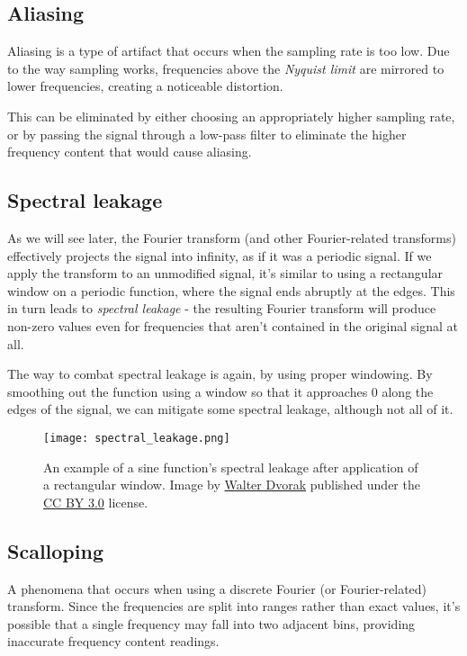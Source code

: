 \subsection{Aliasing}
Aliasing is a type of artifact that occurs when the sampling rate is too low. Due to the way sampling works, frequencies above the \emph{Nyquist limit} are mirrored to lower frequencies, creating a noticeable distortion. \cite{bosi_goldberg_2003}

This can be eliminated by either choosing an appropriately higher sampling rate, or by passing the signal through a low-pass filter to eliminate the higher frequency content that would cause aliasing.

\subsection{Spectral leakage}
As we will see later, the Fourier transform (and other Fourier-related transforms) effectively projects the signal into infinity, as if it was a periodic signal. If we apply the transform to an unmodified signal, it's similar to using a rectangular window on a periodic function, where the signal ends abruptly at the edges. This in turn leads to \emph{spectral leakage} - the resulting Fourier transform will produce non-zero values even for frequencies that aren't contained in the original signal at all.

The way to combat spectral leakage is again, by using proper windowing. By smoothing out the function using a window so that it approaches $0$ along the edges of the signal, we can mitigate some spectral leakage, although not all of it.

\begin{figure}[ht]
	\caption[Spectral leakage example]{An example of a sine function's spectral leakage after application of a rectangular window. Image by \href{https://commons.wikimedia.org/wiki/User:Wdwd}{Walter Dvorak} published under the \href{https://creativecommons.org/licenses/by/3.0/deed.en}{CC BY 3.0} license.}
	\centering
	\texttt{[image: spectral\_leakage.png]}
\end{figure}

\subsection{Scalloping}
A phenomena that occurs when using a discrete Fourier (or Fourier-related) transform. Since the frequencies are split into ranges rather than exact values, it's possible that a single frequency may fall into two adjacent bins, providing inaccurate frequency content readings.

